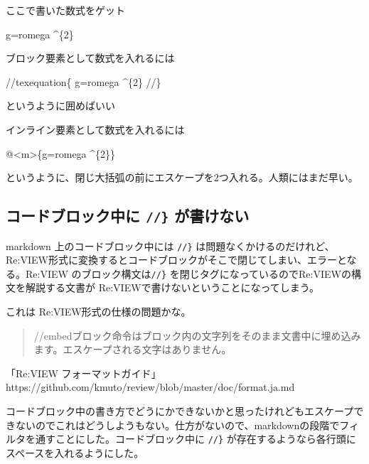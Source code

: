 ここで書いた数式をゲット

\begin{reviewemlist}

g=r\reviewbackslash{}omega \textasciicircum{}\{2\}

\end{reviewemlist}

ブロック要素として数式を入れるには

\begin{reviewemlist}
//texequation\{
g=r\reviewbackslash{}omega \textasciicircum{}\{2\}
//\}
\end{reviewemlist}

というように囲めばいい

インライン要素として数式を入れるには

\begin{reviewemlist}
@\textless{}m\textgreater{}\{g=r\reviewbackslash{}omega \textasciicircum{}\{2\reviewbackslash{}\reviewbackslash{}\}\}
\end{reviewemlist}

というように、閉じ大括弧の前にエスケープを2つ入れる。人類にはまだ早い。

\subsection*{コードブロック中に \texttt{//\}} が書けない}
\label{sec:4-8-2}

markdown 上のコードブロック中には \texttt{//\}} は問題なくかけるのだけれど、Re:VIEW形式に変換するとコードブロックがそこで閉じてしまい、エラーとなる。Re:VIEW のブロック構文は\texttt{//\}} を閉じタグになっているのでRe:VIEWの構文を解説する文書が Re:VIEWで書けないということになってしまう。

これは Re:VIEW形式の仕様の問題かな。

\begin{quote}
//embedブロック命令はブロック内の文字列をそのまま文書中に埋め込みます。エスケープされる文字はありません。

\end{quote}

「Re:VIEW フォーマットガイド」
https://github.com/kmuto/review/blob/master/doc/format.ja.md

コードブロック中の書き方でどうにかできないかと思ったけれどもエスケープできないのでこれはどうしようもない。仕方がないので、markdownの段階でフィルタを通すことにした。コードブロック中に \texttt{//\}} が存在するようなら各行頭にスペースを入れるようにした。

